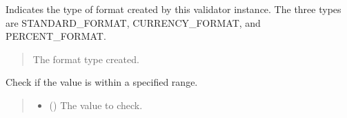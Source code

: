 \documentclass[letterpaper,10pt,english]{sphinxmanual}
\begin{document}
\begin{fulllineitems}
\begin{fulllineitems}
\begin{quote}
\begin{description}
\end{description}\end{quote}

\end{fulllineitems}


\begin{fulllineitems}
\label{\detokenize{apache_commons_validator_python.routines:apache_commons_validator_python.routines.abstract_number_validator.AbstractNumberValidator.format_type}}
\pysigstartsignatures
{}
\pysigstopsignatures
\sphinxAtStartPar
Indicates the type of format created by this validator instance. The three
types are STANDARD\_FORMAT, CURRENCY\_FORMAT, and PERCENT\_FORMAT.
\begin{quote}\begin{description}
\sphinxAtStartPar
The format type created.

\end{description}\end{quote}

\end{fulllineitems}


\begin{fulllineitems}
\label{\detokenize{apache_commons_validator_python.routines:apache_commons_validator_python.routines.abstract_number_validator.AbstractNumberValidator.is_in_range}}
\pysigstartsignatures
{}
\pysigstopsignatures
\sphinxAtStartPar
Check if the value is within a specified range.
\begin{quote}\begin{description}
\begin{itemize}
\item {} 
\sphinxAtStartPar
{} () \textendash{} The value to check.


\end{itemize}
\end{description}
\end{quote}
\end{fulllineitems}
\end{fulllineitems}
\end{document}
